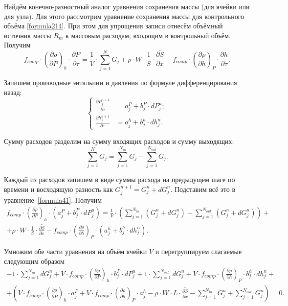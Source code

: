 
\label{sec:subsection41}

Найдём конечно-разностный аналог уравнения сохранения массы (для ячейки или для узла). Для этого рассмотрим уравнение сохранения массы для контрольного объёма \eqref{formula214}. При этом для упрощения записи отнесём объёмный источник массы $R_m$ к массовым расходам, входящим в контрольный объём. Получим
\begin{equation}
\label{formula41}
f_{comp}\cdot\left(\frac{\partial\rho}{\partial P}\right)_{h}\cdot \frac{\partial P}{\partial\tau} =
\frac 1 V \cdot \sum_{j=1}^{N} G_j + \rho\cdot W \cdot \frac 1 S \cdot \overline{\frac{\partial S}{\partial x}} - f_{comp}\cdot\left(\frac{\partial\rho}{\partial h}\right)_{P}\cdot \frac{\partial h}{\partial\tau}.
\end{equation}

Запишем производные энтальпии и давления по формуле дифференцирования назад:
$$
\left\{
\begin{aligned}
\frac{\partial P_j^{n+1}}{\partial\tau} & = a_j^P + b_j^P \cdot dP_j^n; \\
\frac{\partial h_j^{n+1}}{\partial\tau} & = a_j^h + b_j^h \cdot dh_j^n.
\end{aligned}
\right.
$$

Сумму расходов разделим на сумму входящих расходов и сумму выходящих:
$$
\sum_{j=1}^{N} G_j=\sum_{j=1}^{N_{in}} G_j - \sum_{j=1}^{N_{out}} G_j.
$$

Каждый из расходов запишем в виде суммы расхода на предыдущем шаге по времени и восходящую разность как $G_j^{n+1}=G_j^n+dG_j^n$. Подставим всё это в уравнение~\eqref{formula41}. Получим
\begin{eqnarray}
\label{formula42}
f_{comp}\cdot\left(\frac{\partial\rho}{\partial P}\right)_{h}\cdot (a_j^P + b_j^P \cdot dP_j^n) =
\frac 1 V \cdot \left(\sum_{j=1}^{N_{in}} (G_j^n+dG_j^n) - \sum_{j=1}^{N_{out}} (G_j^n+dG_j^n)\right) + \nonumber ~\\
+ \rho\cdot W \cdot \frac 1 S \cdot \overline{\frac{\partial S}{\partial x}} - f_{comp}\cdot\left(\frac{\partial\rho}{\partial h}\right)_{P}\cdot (a_j^h + b_j^h \cdot dh_j^n).
\end{eqnarray}

Умножим обе части уравнения на объём ячейки $V$ и перегруппируем слагаемые следующим образом
\begin{eqnarray}
\label{formula43}
-1 \cdot \sum_{j=1}^{N_{in}} dG_j^n + V \cdot f_{comp}\cdot \left( \frac{\partial\rho}{\partial P}\right)_{h} \cdot b_j^P \cdot dP_j^n + 1 \cdot \sum_{j=1}^{N_{out}} dG_j^n + V \cdot f_{comp}\cdot\left(\frac{\partial\rho}{\partial h}\right)_{P} \cdot b_j^h \cdot dh_j^n + \nonumber ~\\
+ \left(V \cdot f_{comp}\cdot \left( \frac{\partial\rho}{\partial P}\right)_{h} \cdot a_j^P + V \cdot f_{comp}\cdot \left(\frac{\partial\rho}{\partial h}\right)_{P}\cdot a_j^h - \rho\cdot W \cdot L \cdot \overline{\frac{\partial S}{\partial x}} - \sum_{j=1}^{N_{in}} G_j^n + \sum_{j=1}^{N_{out}} G_j^n \right) = 0. 
\end{eqnarray}

